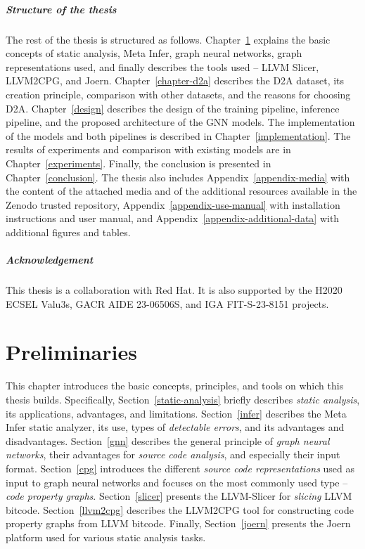 \paragraph{Structure of the thesis}
The rest of the thesis is structured as follows. Chapter~\ref{preliminaries} explains the basic concepts of static analysis, Meta Infer, graph neural networks, graph representations used, and finally describes the tools used -- LLVM Slicer, LLVM2CPG, and Joern. Chapter~\ref{chapter-d2a} describes the D2A dataset, its creation principle, comparison with other datasets, and the reasons for choosing D2A. Chapter~\ref{design} describes the design of the training pipeline, inference pipeline, and the proposed architecture of the GNN models. The implementation of the models and both pipelines is described in Chapter~\ref{implementation}. The results of experiments and comparison with existing models are in Chapter~\ref{experiments}. Finally, the conclusion is presented in Chapter~\ref{conclusion}. The thesis also includes Appendix~\ref{appendix-media} with the content of the attached media and of the additional resources available in the Zenodo trusted repository, Appendix~\ref{appendix-use-manual} with installation instructions and user manual, and Appendix~\ref{appendix-additional-data} with additional figures and tables.

\paragraph{Acknowledgement} This thesis is a collaboration with Red Hat. It is also supported by the H2020 ECSEL Valu3s, GACR AIDE 23-06506S, and IGA FIT-S-23-8151 projects.


\chapter{Preliminaries}
\label{preliminaries}
This chapter introduces the basic concepts, principles, and tools on which this thesis builds. Specifically, Section~\ref{static-analysis} briefly describes \textit{static analysis}, its applications, advantages, and limitations. Section~\ref{infer} describes the Meta Infer static analyzer, its use, types of \textit{detectable errors}, and its advantages and disadvantages. Section~\ref{gnn} describes the general principle of \textit{graph neural networks}, their advantages for \textit{source code analysis}, and especially their input format. Section~\ref{cpg} introduces the different \textit{source code representations} used as input to graph neural networks and focuses on the most commonly used type -- \textit{code property graphs}. Section~\ref{slicer} presents the LLVM-Slicer for \textit{slicing} LLVM bitcode. Section~\ref{llvm2cpg} describes the LLVM2CPG tool for constructing code property graphs from LLVM bitcode. Finally, Section~\ref{joern} presents the Joern platform used for various static analysis tasks.


